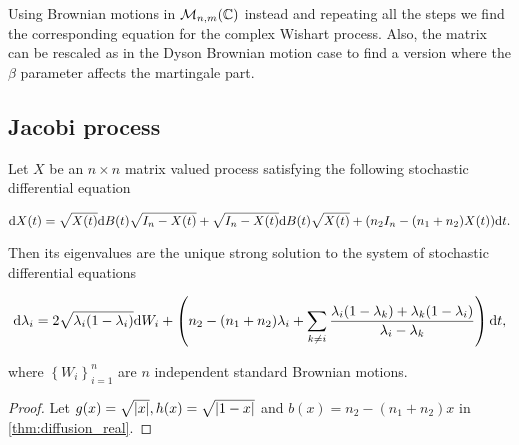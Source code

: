 Using Brownian motions in $\mathcal M_{n,m}(\mathbb C)$ instead and repeating all the steps we find the corresponding equation for the complex Wishart process. Also, the matrix can be rescaled as in the Dyson Brownian motion case to find a version where the $\beta$ parameter affects the martingale part.

\subsection{Jacobi process}


\begin{corollary}
    Let $X$ be an $n\times n$ matrix valued process satisfying the following stochastic differential equation

    \begin{equation*}
        \mathrm d X (t) = \sqrt{X(t)} \mathrm d B(t) \sqrt{I_n - X(t)} + \sqrt{I_n - X(t)} \mathrm d B(t) \sqrt{X(t)} + (n_2 I_n - (n_1 + n_2) X(t) ) \mathrm d t.
    \end{equation*}

    Then its eigenvalues are the unique strong solution to the system of stochastic differential equations

    \begin{equation} \label{eq:jacobi}
        \mathrm d \lambda_i = 2 \sqrt{\lambda_i(1-\lambda_i)} \mathrm d W_i + \left( n_2 -(n_1 + n_2)\lambda_i + \sum_{k\neq i} \frac{\lambda_i(1-\lambda_k) + \lambda_k(1-\lambda_i)}{\lambda_i - \lambda_k} \right) \mathrm d t,
    \end{equation}

    \noindent where $\left\{ W_{i} \right\}_{i=1}^n$ are $n$ independent standard Brownian motions.
\end{corollary}

\begin{proof}
    Let $g(x) = \sqrt{\lvert x \rvert}, h(x) = \sqrt{\lvert 1-x \rvert}$ and $b(x) = n_2 - (n_1 + n_2)x$ in \ref{thm:diffusion_real}. 
\end{proof}